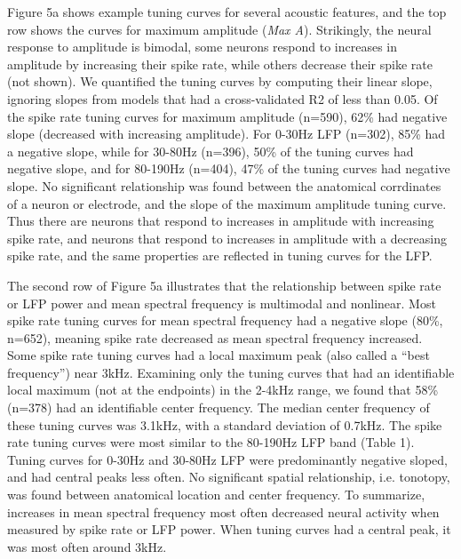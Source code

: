 Figure 5a shows example tuning curves for several acoustic features, and the top row shows the curves for maximum amplitude ({\em Max A}). Strikingly, the neural response to amplitude is bimodal, some neurons respond to increases in amplitude by increasing their spike rate, while others decrease their spike rate (not shown). We quantified the tuning curves by computing their linear slope, ignoring slopes from models that had a cross-validated R2 of less than 0.05. Of the spike rate tuning curves for maximum amplitude (n=590), 62\% had negative slope (decreased with increasing amplitude). For 0-30Hz LFP (n=302), 85\% had a negative slope, while for 30-80Hz (n=396), 50\% of the tuning curves had negative slope, and for 80-190Hz (n=404), 47\% of the tuning curves had negative slope. No significant relationship was found between the anatomical corrdinates of a neuron or electrode, and the slope of the maximum amplitude tuning curve. Thus there are neurons that respond to increases in amplitude with increasing spike rate, and neurons that respond to increases in amplitude with a decreasing spike rate, and the same properties are reflected in tuning curves for the LFP.

The second row of Figure 5a illustrates that the relationship between spike rate or LFP power and mean spectral frequency is multimodal and nonlinear. Most spike rate tuning curves for mean spectral frequency had a negative slope (80\%, n=652), meaning spike rate decreased as mean spectral frequency increased. Some spike rate tuning curves had a local maximum peak (also called a “best frequency”) near 3kHz. Examining only the tuning curves that had an identifiable local maximum (not at the endpoints) in the 2-4kHz range, we found that 58\% (n=378) had an identifiable center frequency. The median center frequency of these tuning curves was 3.1kHz, with a standard deviation of 0.7kHz. The spike rate tuning curves were most similar to the 80-190Hz LFP band (Table 1). Tuning curves for 0-30Hz and 30-80Hz LFP were predominantly negative sloped, and had central peaks less often. No significant spatial relationship, i.e. tonotopy, was found between anatomical location and center frequency. To summarize, increases in mean spectral frequency most often decreased neural activity when measured by spike rate or LFP power. When tuning curves had a central peak, it was most often around 3kHz.

